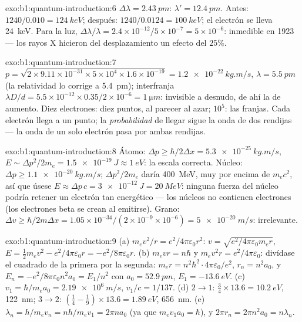 \begin{solution}{exo:b1:quantum-introduction:6}
$\Delta\lambda = \qty{2.43}{pm}$: $\lambda' = \qty{12.4}{pm}$. Antes: $1240/0.010 =
\qty{124}{keV}$; después: $1240/0.0124 = \qty{100}{keV}$; el electrón se lleva
\qty{24}{keV}. Para la luz, $\Delta\lambda/\lambda = 2.4 \times 10^{-12}/5 \times 10^{-7} = 5 \times
10^{-6}$: inmedible en 1923 --- los rayos X hicieron del desplazamiento un efecto del $25\%$.
\end{solution}

\begin{solution}{exo:b1:quantum-introduction:7}
$p = \sqrt{2 \times 9.11 \times 10^{-31} \times 5 \times 10^4 \times 1.6 \times 10^{-19}} =
\qty{1.2e-22}{kg.m/s}$, $\lambda = \qty{5.5}{pm}$ (la relatividad lo corrige a
\qty{5.4}{pm}); interfranja $\lambda D/d = 5.5 \times 10^{-12} \times 0.35/2 \times 10^{-6}
= \qty{1}{\micro m}$: invisible a  desnudo, de ahí la  de aumento. Diez
electrones: diez puntos, al parecer al azar; $10^5$: las franjas. Cada
electrón llega a un punto; la \emph{probabilidad} de llegar sigue
la onda de dos rendijas --- la onda de un solo electrón pasa por ambas rendijas.
\end{solution}

\begin{solution}{exo:b1:quantum-introduction:8}
Átomo: $\Delta p \geq \hbar/2\Delta x = \qty{5.3e-25}{kg.m/s}$, $E \sim \Delta p^2/2m_e =
\qty{1.5e-19}{J} \approx \qty{1}{eV}$: la escala correcta. Núcleo: $\Delta p \geq
\qty{1.1e-20}{kg.m/s}$; $\Delta p^2/2m_e$ daría \qty{400}{MeV}, muy por encima de
$m_ec^2$, así que úsese $E \approx \Delta p\,c = \qty{3e-12}{J} = \qty{20}{MeV}$: ninguna
fuerza del núcleo podría retener un electrón tan energético --- los núcleos no
contienen electrones (los electrones beta se crean al emitirse). Grano: $\Delta v \geq
\hbar/2m\Delta x = 1.05 \times 10^{-34}/(2 \times 10^{-9} \times 10^{-6}) = \qty{5e-20}{m/s}$:
irrelevante.
\end{solution}

\begin{solution}{exo:b1:quantum-introduction:9}
(a) $m_ev^2/r = e^2/4\pi\varepsilon_0r^2$: $v = \sqrt{e^2/4\pi\varepsilon_0m_er}$, $E =
\tfrac12m_ev^2 - e^2/4\pi\varepsilon_0r = -e^2/8\pi\varepsilon_0r$. (b) $m_evr = n\hbar$ y
$m_ev^2r = e^2/4\pi\varepsilon_0$: divídase el cuadrado de la primera por la segunda:
$m_er = n^2\hbar^2 \cdot 4\pi\varepsilon_0/e^2$, $r_n = n^2a_0$, y $E_n = -e^2/8\pi\varepsilon_0n^2a_0
= E_1/n^2$ con $a_0 = \qty{52.9}{pm}$, $E_1 = \qty{-13.6}{eV}$. (c) $v_1 =
\hbar/m_ea_0 = \qty{2.19e6}{m/s}$, $v_1/c = 1/137$. (d) $2 \to 1$: $\tfrac34 \times
13.6 = \qty{10.2}{eV}$, \qty{122}{nm}; $3 \to 2$: $(\tfrac14 - \tfrac19) \times 13.6 =
\qty{1.89}{eV}$, \qty{656}{nm}. (e) $\lambda_n = h/m_ev_n = nh/m_ev_1 = 2\pi na_0$
(ya que $m_ev_1a_0 = \hbar$), y $2\pi r_n = 2\pi n^2a_0 = n\lambda_n$.
\end{solution}

